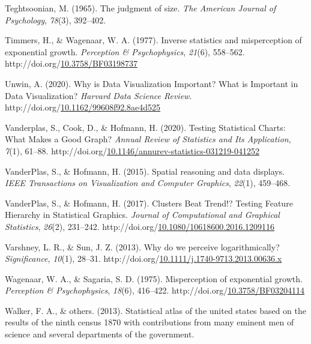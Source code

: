 \documentclass[print]{nuthesis}
\newlength{\cslhangindent}
\newenvironment{CSLReferences}%
{\setlength{\parindent}{0pt}%
\everypar{\setlength{\hangindent}{\cslhangindent}}\ignorespaces}%
{\par}
\begin{document}
\begin{CSLReferences}{1}{0}
\leavevmode\hypertarget{ref-teghtsoonian1965judgment}{}%
Teghtsoonian, M. (1965). The judgment of size. \emph{The American Journal of Psychology}, \emph{78}(3), 392--402.

\leavevmode\hypertarget{ref-timmers_inverse_1977}{}%
Timmers, H., \& Wagenaar, W. A. (1977). Inverse statistics and misperception of exponential growth. \emph{Perception \& Psychophysics}, \emph{21}(6), 558--562. http://doi.org/\href{https://doi.org/10.3758/BF03198737}{10.3758/BF03198737}

\leavevmode\hypertarget{ref-unwin_why_2020}{}%
Unwin, A. (2020). Why is {Data} {Visualization} {Important}? {What} is {Important} in {Data} {Visualization}? \emph{Harvard Data Science Review}. http://doi.org/\href{https://doi.org/10.1162/99608f92.8ae4d525}{10.1162/99608f92.8ae4d525}

\leavevmode\hypertarget{ref-vanderplas_testing_2020}{}%
Vanderplas, S., Cook, D., \& Hofmann, H. (2020). Testing {Statistical} {Charts}: {What} {Makes} a {Good} {Graph}? \emph{Annual Review of Statistics and Its Application}, \emph{7}(1), 61--88. http://doi.org/\href{https://doi.org/10.1146/annurev-statistics-031219-041252}{10.1146/annurev-statistics-031219-041252}

\leavevmode\hypertarget{ref-vanderplas2015spatial}{}%
VanderPlas, S., \& Hofmann, H. (2015). Spatial reasoning and data displays. \emph{IEEE Transactions on Visualization and Computer Graphics}, \emph{22}(1), 459--468.

\leavevmode\hypertarget{ref-vanderplas_clusters_2017}{}%
VanderPlas, S., \& Hofmann, H. (2017). Clusters {Beat} {Trend}!? {Testing} {Feature} {Hierarchy} in {Statistical} {Graphics}. \emph{Journal of Computational and Graphical Statistics}, \emph{26}(2), 231--242. http://doi.org/\href{https://doi.org/10.1080/10618600.2016.1209116}{10.1080/10618600.2016.1209116}

\leavevmode\hypertarget{ref-varshney_why_2013}{}%
Varshney, L. R., \& Sun, J. Z. (2013). Why do we perceive logarithmically? \emph{Significance}, \emph{10}(1), 28--31. http://doi.org/\href{https://doi.org/10.1111/j.1740-9713.2013.00636.x}{10.1111/j.1740-9713.2013.00636.x}

\leavevmode\hypertarget{ref-wagenaar_misperception_1975}{}%
Wagenaar, W. A., \& Sagaria, S. D. (1975). Misperception of exponential growth. \emph{Perception \& Psychophysics}, \emph{18}(6), 416--422. http://doi.org/\href{https://doi.org/10.3758/BF03204114}{10.3758/BF03204114}

\leavevmode\hypertarget{ref-walker2013statistical}{}%
Walker, F. A., \& others. (2013). Statistical atlas of the united states based on the results of the ninth census 1870 with contributions from many eminent men of science and several departments of the government.


\end{CSLReferences}
\end{document}
